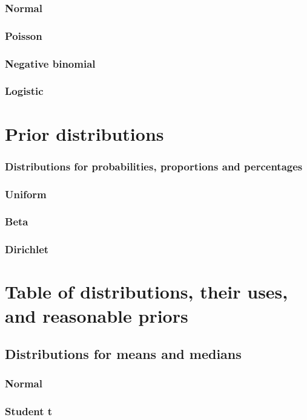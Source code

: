 \documentclass[11pt,fullpage]{book}
\begin{document}
\subsubsection{Normal}
\subsubsection{Poisson}
\subsubsection{Negative binomial}
\subsubsection{Logistic}

\section{Prior distributions}
\subsubsection{Distributions for probabilities, proportions and percentages}
\subsubsection{Uniform}
\subsubsection{Beta}
\subsubsection{Dirichlet}

\section{Table of distributions, their uses, and reasonable priors}

\subsection{Distributions for means and medians}
\subsubsection{Normal}
\subsubsection{Student t}
\end{document}
